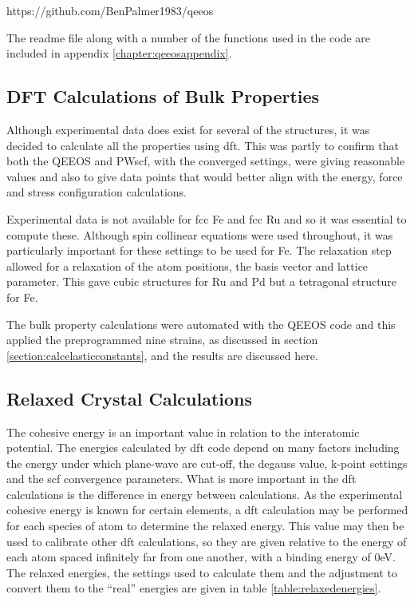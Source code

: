 https://github.com/BenPalmer1983/qeeos

The readme file along with a number of the functions used in the code are included in appendix \ref{chapter:qeeosappendix}.


\subsection{DFT Calculations of Bulk Properties}

Although experimental data does exist for several of the structures, it was decided to calculate all the properties using \acrshort{dft}.  This was partly to confirm that both the QEEOS and PWscf, with the converged settings, were giving reasonable values and also to give data points that would better align with the energy, force and stress configuration calculations.

Experimental data is not available for \acrshort{fcc} Fe and \acrshort{fcc} Ru and so it was essential to compute these.  Although spin collinear equations were used throughout, it was particularly important for these settings to be used for Fe.  The relaxation step allowed for a relaxation of the atom positions, the basis vector and lattice parameter.  This gave cubic structures for Ru and Pd but a tetragonal structure for Fe.

The bulk property calculations were automated with the QEEOS code and this applied the preprogrammed nine strains, as discussed in section \ref{section:calcelasticconstants}, and the results are discussed here. 


\subsection{Relaxed Crystal Calculations}

The cohesive energy is an important value in relation to the interatomic potential.  The energies calculated by \acrshort{dft} code depend on many factors including the energy under which plane-wave are cut-off, the degauss value, k-point settings and the \acrshort{scf} convergence parameters.  What is more important in the \acrshort{dft} calculations is the difference in energy between calculations.  As the experimental cohesive energy is known for certain elements, a \acrshort{dft} calculation may be performed for each species of atom to determine the relaxed energy.  This value may then be used to calibrate other \acrshort{dft} calculations, so they are given relative to the energy of each atom spaced infinitely far from one another, with a binding energy of 0eV.  The relaxed energies, the settings used to calculate them and the adjustment to convert them to the \enquote{real} energies are given in table \ref{table:relaxedenergies}.

